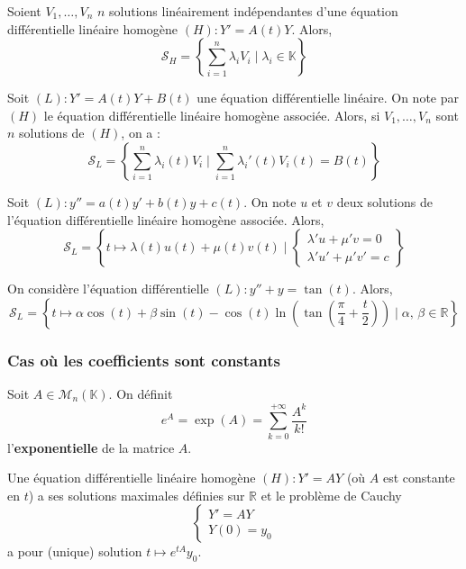 	\begin{proposition}
		Soient $V_1, \dots, V_n$ $n$ solutions linéairement indépendantes d'une équation différentielle linéaire homogène $(H) : Y' = A(t) Y$. Alors,
		\[ \mathcal{S}_H = \left\{\sum_{i=1}^n \lambda_i V_i \mid \lambda_i \in \mathbb{K} \right\} \]
	\end{proposition}

	\begin{corollary}
		Soit $(L) : Y' = A(t) Y + B(t)$ une équation différentielle linéaire. On note par $(H)$ le équation différentielle linéaire homogène associée. Alors, si $V_1, \dots, V_n$ sont $n$ solutions de $(H)$, on a :
		\[ \mathcal{S}_L = \left\{\sum_{i=1}^n \lambda_i(t) V_i \mid \sum_{i=1}^n \lambda_i'(t) V_i(t) = B(t)\right\} \]
	\end{corollary}

	\begin{example}
		Soit $(L) : y'' = a(t) y' + b(t)y + c(t)$. On note $u$ et $v$ deux solutions de l'équation différentielle linéaire homogène associée. Alors,
		\[ \mathcal{S}_L = \left\{t \mapsto \lambda(t) u(t) + \mu(t) v(t) \mid \begin{cases} \lambda'u + \mu'v = 0 \\ \lambda' u' + \mu' v' = c \end{cases} \right\} \]
	\end{example}

	\begin{example}
		On considère l'équation différentielle $(L) : y'' + y = \tan(t)$. Alors,
		\[ \mathcal{S}_L = \left\{t \mapsto \alpha \cos(t) + \beta \sin(t) - \cos(t) \ln \left( \tan \left( \frac{\pi}{4} + \frac{t}{2} \right) \right) \mid \alpha, \, \beta \in \mathbb{R} \right\} \]
	\end{example}

	\subsubsection{Cas où les coefficients sont constants}

	\begin{definition}
		Soit $A \in \mathcal{M}_n(\mathbb{K})$. On définit
		\[ e^{A} = \exp(A) = \sum_{k=0}^{+\infty} \frac{A^k}{k!} \]
		l'\textbf{exponentielle} de la matrice $A$.
	\end{definition}

	\begin{proposition}
		Une équation différentielle linéaire homogène $(H) : Y' = AY$ (où $A$ est constante en $t$) a ses solutions maximales définies sur $\mathbb{R}$ et le problème de Cauchy
		\[ \begin{cases} Y' = AY \\ Y(0) = y_0 \end{cases} \]
		a pour (unique) solution $t \mapsto e^{tA} y_0$.
	\end{proposition}

